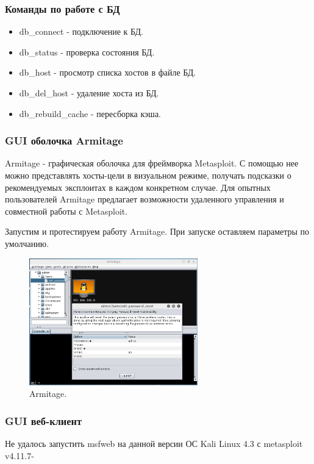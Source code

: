 \documentclass[10pt,a4paper]{article}
\begin{document}
\subsubsection{Команды по работе с БД}
\begin{itemize}
\item db\_connect - подключение к БД.
\item db\_status - проверка состояния БД.
\item db\_host - просмотр списка хостов в файле БД.
\item db\_del\_host - удаление хоста из БД.
\item db\_rebuild\_cache - пересборка кэша.
\end{itemize}

\subsubsection{GUI оболочка Armitage}
Armitage - графическая оболочка для фреймворка Metasploit. С помощью нее можно представлять хосты-цели в визуальном режиме, получать подсказки о рекомендуемых эксплоитах в каждом конкретном случае. Для опытных пользователей Armitage предлагает возможности удаленного управления и совместной работы с Metasploit.

Запустим и протестируем работу Armitage. При запуске оставляем параметры по умолчанию.

\begin{figure}[h!]
\begin{center}
\includegraphics[width=0.65\textwidth]{armitage_1}
\caption{Armitage.}
\label{fig:armitage}
\end{center}
\end{figure}

\subsubsection{GUI веб-клиент}
Не удалось запустить msfweb на данной версии ОС Kali Linux 4.3 с metasploit v4.11.7-
\end{document}
